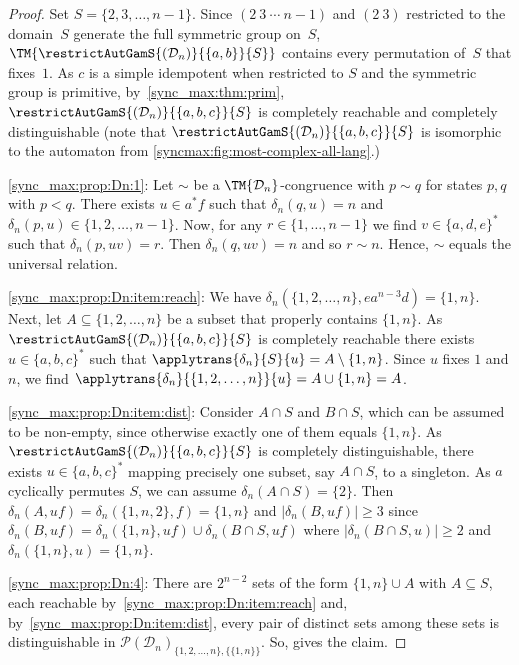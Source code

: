 \begin{proof} 	Set $S = \{2,3,\ldots,n-1\}$.
	Since $(2 ~ 3 ~ \cdots ~ n - 1)$ and $(2~3)$ restricted to the domain~$S$
	generate the full symmetric group on~$S$,
	$\TM{\restrictAutGamS{(\mathcal D_n)}{\{a,b\}}{S}}$
	contains every permutation of~$S$ that fixes~$1$.
	As $c$ is a simple idempotent when restricted to $S$
	and the symmetric group is primitive,
	by~\cref{sync_max:thm:prim},
	$\restrictAutGamS{(\mathcal D_n)}{\{a,b,c\}}{S}$
	is completely reachable and completely distinguishable (note that $\restrictAutGamS{(\mathcal D_n)}{\{a,b,c\}}{S}$
	is isomorphic to the automaton from \cref{syncmax:fig:most-complex-all-lang}.)
	
\ref{sync_max:prop:Dn:1}:  Let  $\sim$ be a $\TM{\mathcal D_n}$-congruence 
with $p \sim q$ for states $p,q$ with $p < q$.    
There exists $u \in a^*f$
such that $\delta_n(q, u) = n$
and $\delta_n(p, u) \in \{1,2,\ldots,n-1\}$.
Now, for any $r \in \{1,\ldots,n-1\}$
we find $v \in \{a,d,e\}^*$
such that $\delta_n(p, uv) = r$.
Then $\delta_n(q, uv) = n$
and so $r \sim n$. Hence, $\sim$ equals the universal relation.

\ref{sync_max:prop:Dn:item:reach}: 	We have $\delta_n(\{1,2,\ldots,n\}, ea^{n-3}d) = \{1,n\}$.
Next, let $A \subseteq \{1,2,\ldots,n\}$ be a subset that
properly contains $\{1,n\}$.
As $\restrictAutGamS{(\mathcal D_n)}{\{a,b,c\}}{S}$ is completely reachable there exists $u \in \{a,b,c\}^*$
such that $\applytrans{\delta_n}{S}{u} = A \setminus \{1,n\}$.
Since $u$ fixes $1$ and $n$, we find $\applytrans{\delta_n}{\{1,2,\ldots,n\}}{u} = A \cup \{1,n\} = A$.

\ref{sync_max:prop:Dn:item:dist}: Consider $A \cap S$ and $B \cap S$, which can be assumed to be non-empty, 
since otherwise exactly one of them equals $\{1,n\}$.
As $\restrictAutGamS{(\mathcal D_n)}{\{a,b,c\}}{S}$ is completely distinguishable,
there exists $u \in \{a,b,c\}^*$ mapping precisely
one subset, say $A \cap S$, to a singleton.
As $a$ cyclically permutes $S$, we can assume $\delta_n(A \cap S) = \{2\}$.
Then $\delta_n(A, uf) = \delta_n(\{1,n,2\},f) = \{1,n\}$ 
and $|\delta_n(B, uf)| \ge 3$
since 
$\delta_n(B, uf) = \delta_n(\{1,n\}, uf) \cup \delta_n(B \cap S, uf)$
where $|\delta_n(B \cap S, u)| \ge 2$
and $\delta_n(\{1,n\}, u) = \{1,n\}$.

\ref{sync_max:prop:Dn:4}: There are $2^{n-2}$ sets of the form $\{1,n\} \cup A$
with $A \subseteq S$,
each reachable by~\ref{sync_max:prop:Dn:item:reach} and, by~\ref{sync_max:prop:Dn:item:dist}, every
pair of distinct sets among these sets is 
distinguishable in $\mathcal P(\mathcal D_n)_{\{1,2,\ldots,n\}, \{\{1,n\}\}}$.
So, 
gives the claim.
\end{proof}


